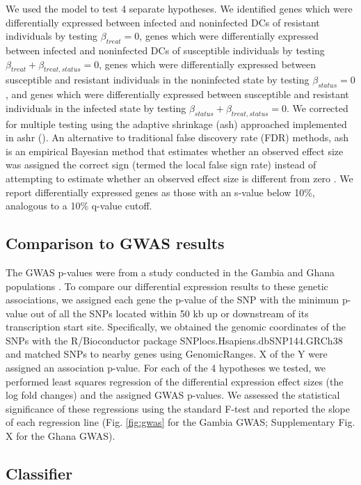 \documentclass[fleqn,10pt]{wlscirep}
\begin{document}
We used the model to test 4 separate hypotheses. We identified genes
which were differentially expressed between infected and noninfected
DCs of resistant individuals by testing $\beta_{treat} = 0$, genes
which were differentially expressed between infected and noninfected
DCs of susceptible individuals by testing $\beta_{treat} +
\beta_{treat,status} = 0$, genes which were differentially expressed
between susceptible and resistant individuals in the noninfected state
by testing $\beta_{status} = 0$, and genes which were differentially
expressed between susceptible and resistant individuals in the
infected state by testing $\beta_{status} + \beta_{treat,status} = 0$.
We corrected for multiple testing using the adaptive shrinkage (ash)
approached implemented in ashr (). An alternative to traditional false
discovery rate (FDR) methods, ash is an empirical Bayesian method that
estimates whether an observed effect size was assigned the correct
sign (termed the local false sign rate) instead of attempting to
estimate whether an observed effect size is different from zero
\cite{Stephens2016}. We report differentially expressed genes as those
with an s-value below 10\%, analogous to a 10\% q-value cutoff.
\subsection*{Comparison to GWAS results}

The GWAS p-values were from a study conducted in the Gambia and Ghana
populations \cite{Thye2010}. To compare our differential expression
results to these genetic associations, we assigned each gene the
p-value of the SNP with the minimum p-value out of all the SNPs
located within 50 kb up or downstream of its transcription start site.
Specifically, we obtained the genomic coordinates of the SNPs with the
R/Bioconductor package SNPlocs.Hsapiens.dbSNP144.GRCh38 and matched
SNPs to nearby genes using GenomicRanges. X of the Y were assigned an
association p-value. For each of the 4 hypotheses we tested, we
performed least squares regression of the differential expression
effect sizes (the log fold changes) and the assigned GWAS p-values. We
assessed the statistical significance of these regressions using the
standard F-test and reported the slope of each regression line (Fig.
\ref{fig:gwas} for the Gambia GWAS; Supplementary Fig. X for the Ghana
GWAS).
\subsection*{Classifier}
\end{document}
